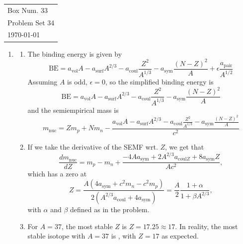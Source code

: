 \documentclass[10pt]{article}
\begin{document}
  \begin{tabular}{l}
    Box Num. 33 \\
    Problem Set 34 \\
    \today
  \end{tabular}

  \begin{enumerate}
    \item \begin{enumerate}
        \item The binding energy is given by
        \begin{equation*}
            \text{BE} = a_{\text{vol}} A
            - a_{\text{surf}} A^{2/3}
            - a_{\text{coul}} \frac{Z^2}{A^{1/3}}
            - a_{\text{sym}} \frac{(N-Z)^2}{A}
            + \epsilon \frac{a_{\text{pair}}}{A^{1/2}}
        \end{equation*}
        Assuming $A$ is odd, $\epsilon=0$, so the simplified binding energy is
        \begin{equation*}
            \text{BE} = a_{\text{vol}} A
            - a_{\text{surf}} A^{2/3}
            - a_{\text{coul}} \frac{Z^2}{A^{1/3}}
            - a_{\text{sym}} \frac{(N-Z)^2}{A}
        \end{equation*}
        and the semiempirical mass is
        \begin{equation*}
            m_{\text{nuc}} = Zm_p + Nm_n - \frac{a_{\text{vol}} A
            - a_{\text{surf}} A^{2/3}
            - a_{\text{coul}} \frac{Z^2}{A^{1/3}}
            - a_{\text{sym}} \frac{(N-Z)^2}{A}}{c^2}
        \end{equation*}

        \item If we take the derivative of the SEMF wrt. $Z$, we get that
        \begin{equation*}
            \frac{dm_{\text{nuc}}}{dZ} = m_p - m_n +
            \frac{-4A a_{\text{sym}} + 2 A^{2/3} a_{\text{coul}Z} + 8a_{\text{sym}}Z}{Ac^2},
        \end{equation*}
        which has a zero at
        \begin{equation*}
            Z = \frac{A(4a_{\text{sym}} + c^2 m_n - c^2 m_p)}{2(A^{2/3}a_{\text{coul}} + 4a_{\text{sym}})} =
            \frac{A}{2} \frac{1+\alpha}{1+\beta A^{2/3}},
        \end{equation*}
        with $\alpha$ and $\beta$ defined as in the problem.

        \item For $A=37$, the most stable $Z$ is $Z=17.25 \approx 17$. In reality, the most stable isotope with $A=37$ is , with $Z=17$ as expected.


\end{enumerate}
\end{enumerate}
\end{document}
